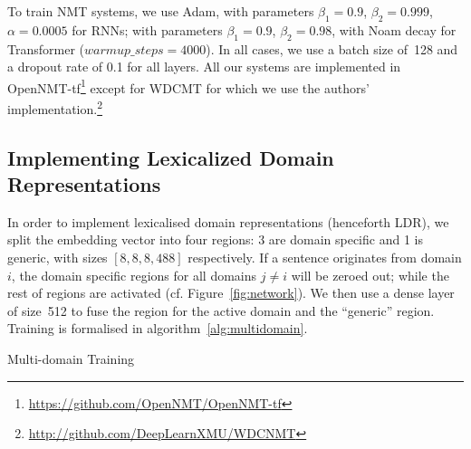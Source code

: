 \documentclass[11pt,a4paper]{article}
\newcommand{\fyDone}[1]{\done[FY]\Todo[FY:]{\textcolor{orange}{#1}}}
\begin{document}
To train NMT systems, we use Adam, with parameters $\beta_1=0.9$, $\beta_2 = 0.999$, $\alpha=0.0005$ for RNNs; with parameters $\beta_1=0.9$, $\beta_2= 0.98$, with Noam decay \cite{Vaswani17attention} for Transformer ($warmup\_steps=4000$). In all cases, we use a batch size of~128 and a dropout rate of 0.1 for all layers. 
All our systems are implemented in OpenNMT-tf\footnote{\url{https://github.com/OpenNMT/OpenNMT-tf}} \cite{Klein2017OpenNMT} except for WDCMT for which we use the authors' implementation.\footnote{\noindent\url{http://github.com/DeepLearnXMU/WDCNMT}}\fyDone{batch size}

\subsection{Implementing Lexicalized Domain Representations}\fyDone{Check acronym.}

\fyDone{Motivate the split - discuss experimentally embedding size}
In order to implement lexicalised domain representations (henceforth LDR), we split the embedding vector into four regions: 3 are domain specific and 1 is generic, with sizes $[8,8,8,488]$ respectively. %
If a sentence originates from domain $i$, the domain specific regions for all domains $j \neq i$ will be zeroed out; while the rest of regions are activated (cf. Figure~\ref{fig:network}). We then use a dense layer of size~512 to fuse the region for the active domain and the ``generic'' region. Training is formalised in algorithm~\ref{alg:multidomain}.

\begin{algorithm}[h]
\caption{Multi-domain Training}
\label{alg:multidomain}
\begin{algorithmic}[1]
\REPEAT 
{}
\end{algorithmic}
\end{algorithm}
\end{document}
